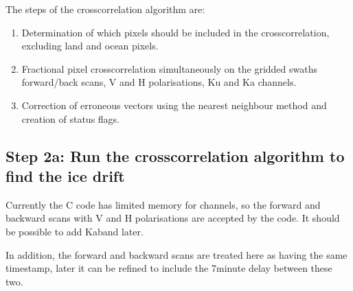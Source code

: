 \documentclass[letterpaper,10pt,english]{jupyterBook}
\begin{document}
\sphinxAtStartPar
The steps of the cross\sphinxhyphen{}correlation algorithm are:
\begin{enumerate}
%
\item {} 
\sphinxAtStartPar
Determination of which pixels should be included in the cross\sphinxhyphen{}correlation, excluding land and ocean pixels.

\item {} 
\sphinxAtStartPar
Fractional pixel cross\sphinxhyphen{}correlation simultaneously on the gridded swaths \sphinxhyphen{} forward/back scans, V and H polarisations, Ku and Ka channels.

\item {} 
\sphinxAtStartPar
Correction of erroneous vectors using the nearest neighbour method and creation of status flags.

\end{enumerate}


\subsection{Step 2a: Run the cross\sphinxhyphen{}correlation algorithm to find the ice drift}
\label{\detokenize{CIMR_L2_Sea_Ice_Drift_algorithm:step-2a-run-the-cross-correlation-algorithm-to-find-the-ice-drift}}
\sphinxAtStartPar
Currently the C code has limited memory for channels, so the forward and backward scans with V and H polarisations are accepted by the code. It should be possible to add Ka\sphinxhyphen{}band later.

\sphinxAtStartPar
In addition, the forward and backward scans are treated here as having the same timestamp, later it can be refined to include the 7\sphinxhyphen{}minute delay between these two.
\end{document}
